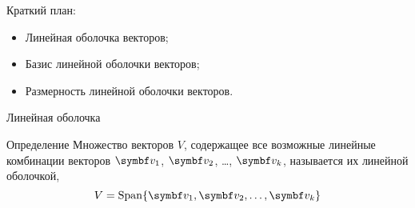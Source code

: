 
\begin{frame} %


\end{frame}



\begin{frame}{Краткий план:}
  \begin{itemize}[<+->]
    \item Линейная оболочка векторов;
    \item Базис линейной оболочки векторов;
    \item Размерность линейной оболочки векторов.
  \end{itemize}

\end{frame}


\begin{frame}{Линейная оболочка}

\begin{block}{Определение} 
Множество векторов $V$, содержащее все возможные линейные комбинации векторов $\bv_1$, 
$\bv_2$, \ldots, $\bv_k$, называется их \alert{линейной оболочкой},
\[
  V = \Span\{ \bv_1, \bv_2, \ldots, \bv_k \}
\]
\end{block}

\end{frame}



